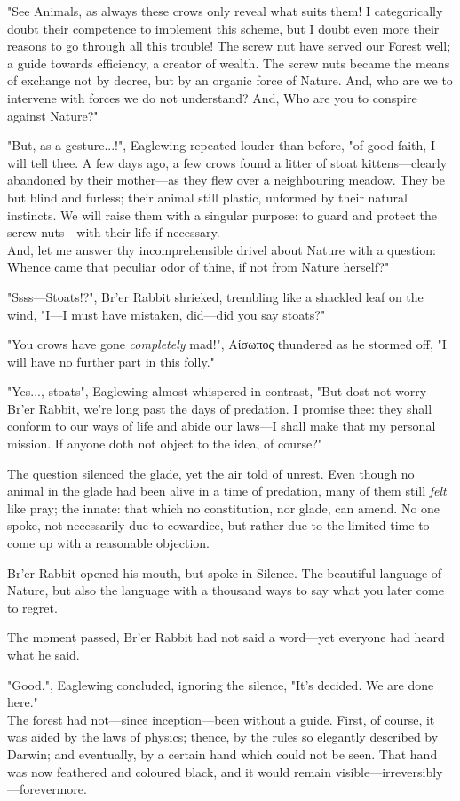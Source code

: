 "See Animals, as always these crows only reveal what suits them! I categorically doubt their competence to implement this scheme, but I doubt even more their reasons to go through all this trouble! The screw nut have served our Forest well; a guide towards efficiency, a creator of wealth. The screw nuts became the means of exchange not by decree, but by an organic force of Nature. And, who are we to intervene with forces we do not understand? And, Who are you to conspire against Nature?"

"But, as a gesture...!", Eaglewing repeated louder than before, "of good faith, I will tell thee. A few days ago, a few crows found a litter of stoat kittens---clearly abandoned by their mother---as they flew over a neighbouring meadow. They be but blind and furless; their animal still plastic, unformed by their natural instincts. We will raise them with a singular purpose: to guard and protect the screw nuts---with their life if necessary.\\
And, let me answer thy incomprehensible drivel about Nature with a question: Whence came that peculiar odor of thine, if not from Nature herself?"

"Ssss---Stoats!?", Br'er Rabbit shrieked, trembling like a shackled leaf on the wind, "I---I must have mistaken, did---did you say stoats?"

"You crows have gone \textit{completely} mad!", Αίσωπος thundered as he stormed off, "I will have no further part in this folly."

"Yes..., stoats", Eaglewing almost whispered in contrast, "But dost not worry Br'er Rabbit, we're long past the days of predation. I promise thee: they shall conform to our ways of life and abide our laws---I shall make that my personal mission. If anyone doth not object to the idea, of course?"

The question silenced the glade, yet the air told of unrest. Even though no animal in the glade had been alive in a time of predation, many of them still \textit{felt} like pray; the innate: that which no constitution, nor glade, can amend. No one spoke, not necessarily due to cowardice, but rather due to the limited time to come up with a reasonable objection.

Br'er Rabbit opened his mouth, but spoke in Silence. The beautiful language of Nature, but also the language with a thousand ways to say what you later come to regret.

The moment passed, Br'er Rabbit had not said a word---yet everyone had heard what he said.

"Good.", Eaglewing concluded, ignoring the silence, "It's decided. We are done here."\\

The forest had not---since inception---been without a guide. First, of course, it was aided by the laws of physics; thence, by the rules so elegantly described by Darwin; and eventually, by a certain hand which could not be seen. That hand was now feathered and coloured black, and it would remain visible---irreversibly---forevermore.